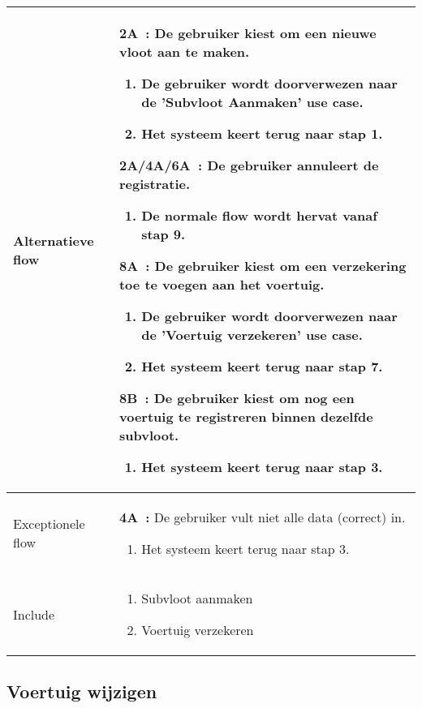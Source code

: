 \documentclass{article}
\begin{document}
\begin{tabularx}{\textwidth}{ | l | X |}
 Alternatieve flow & 
 	\textbf{2A~:} De gebruiker kiest om een nieuwe vloot aan te maken.
 	\begin{enumerate}[label=\alph*]
 		\item De gebruiker wordt doorverwezen naar de 'Subvloot Aanmaken' use case.
 		\item Het systeem keert terug naar stap 1.
 	\end{enumerate}
    \textbf{2A/4A/6A~:} De gebruiker annuleert de registratie.
 	\begin{enumerate}[label=\alph*]
 		\item De normale flow wordt hervat vanaf stap 9.
 	\end{enumerate}
    \textbf{8A~:} De gebruiker kiest om een verzekering toe te voegen aan het voertuig.
 	\begin{enumerate}[label=\alph*]
 		\item De gebruiker wordt doorverwezen naar de 'Voertuig verzekeren' use case.
        \item Het systeem keert terug naar stap 7.
 	\end{enumerate}
    \textbf{8B~:} De gebruiker kiest om nog een voertuig te registreren binnen dezelfde subvloot.
 	\begin{enumerate}[label=\alph*]
 		\item Het systeem keert terug naar stap 3.
 	\end{enumerate}
 \\ 
 \hline
 Exceptionele flow &
    \textbf{4A~:} De gebruiker vult niet alle data (correct) in.
 	\begin{enumerate}[label=\alph*]
 		\item Het systeem keert terug naar stap 3.
 	\end{enumerate}
 
 \\
 \hline
 
 Include & 
 
 \begin{enumerate}
 	\item Subvloot aanmaken
    \item Voertuig verzekeren
 \end{enumerate}\\ 
 \hline
 
 
\end{tabularx}


\newpage
\subsection{Voertuig wijzigen}
\end{document}
